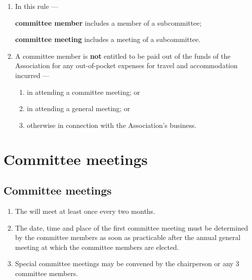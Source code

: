 \documentclass[../constitution.tex]{subfiles}
\begin{document}
\begin{enumerate}

\item In this rule ---

\textbf{committee member} includes a member of a subcommittee;

\textbf{committee meeting} includes a meeting of a subcommittee.

\item A committee member is \textbf{not}  entitled to be paid out of the funds of the Association for any out-of-pocket expenses for travel and accommodation incurred ---

  \begin{enumerate}
  
  \item in attending a committee meeting; or
  \item in attending a general meeting; or
  \item otherwise in connection with the Association's business.
  \end{enumerate}
\end{enumerate}

\hypertarget{division-4-committee-meetings}{%
\section{Committee meetings}\label{division-4-committee-meetings}}

\hypertarget{committee-meetings}{%
\subsection{Committee meetings}\label{committee-meetings}}

\begin{enumerate}

\item The  will meet at least once every two months. 
\item The date, time and place of the first committee meeting must be determined by the committee members as soon as practicable after the annual general meeting at which the committee members are elected. 
\item Special committee meetings may be convened by the chairperson or any 3  committee members.
\end{enumerate}
\end{document}
